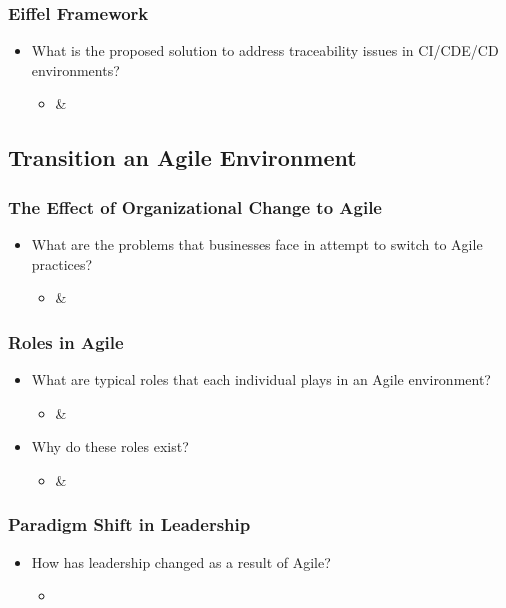 \documentclass[11pt,a4paper]{article}
\begin{document}
		\subsubsection{Eiffel Framework}
		\begin{itemize}[noitemsep]
			\item What is the proposed solution to address traceability issues in CI/CDE/CD environments?
			\begin{itemize}
				\item \cite{stahl_2017} \& \cite{stahl_hallen_bosch_2016}
			\end{itemize}
		\end{itemize}
		
	\subsection{Transition an Agile Environment}
		\subsubsection{The Effect of Organizational Change to Agile}
		\begin{itemize}[noitemsep]
			\item What are the problems that businesses face in attempt to switch to Agile practices?
			\begin{itemize}
				\item \cite{bosch_2014} \& \cite{meyer_2014}
			\end{itemize}
		\end{itemize}
		\subsubsection{Roles in Agile}
		\begin{itemize}[noitemsep]
			\item What are typical roles that each individual plays in an Agile environment?
			\begin{itemize}
				\item \cite{bosch_2014} \& \cite{meyer_2014}
			\end{itemize}
			\item Why do these roles exist?
			\begin{itemize}
				\item \cite{bosch_2014} \& \cite{meyer_2014}
			\end{itemize}
		\end{itemize}
		\subsubsection{Paradigm Shift in Leadership}
		\begin{itemize}[noitemsep]
			\item How has leadership changed as a result of Agile?
			\begin{itemize}
				\item \cite{bosch_2014}
			\end{itemize}
		\end{itemize}
\end{document}
